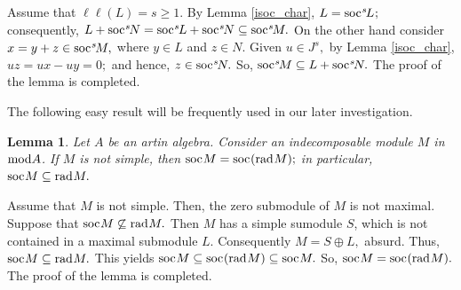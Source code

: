 \documentclass[10pt]{amsart}
\newtheorem{Lemma}[Theo]{Lemma}
\theoremstyle{definition}
\newcommand{\mmod}{{\rm mod}}
\newcommand{\rad}{{\rm rad}\hspace{.5pt}}
\newcommand{\soc}{{\rm soc}\hspace{.5pt}}
\newcommand{\hp}{\hspace{.5pt}}
\begin{document}
\vspace{-1.5pt}

 Assume that $\ell\ell(L)=s\ge 1$. By Lemma \ref{isoc_char}, $L=\soc^s \hspace{-1.2pt} L\hp ;$ consequently, $L+\soc^s\hspace{-1.2pt}N=\soc^s\hspace{-1pt}L+\soc^s\hspace{-1.2pt}N\subseteq \soc^s\hspace{-1.2pt}M.$ On the other hand consider $x=y+z\in \soc^s\hspace{-1.2pt}M,$ where $y\in L$ and $z\in N.$ Given $u\in J^s,$ by Lemma \ref{isoc_char}, $u z=ux - uy=0;$ and hence, $z\in \soc^s\hspace{-1.2pt}N.$ So, $\soc^s\hspace{-1.2pt}M\subseteq L+\soc^s\hspace{-1.2pt}N.$ The proof of the lemma is completed.

\smallskip

The following easy result will be frequently used in our later investigation. \vspace{-1pt}

\begin{Lemma}\label{soc_rad} Let $A$ be an artin algebra. Consider an indecomposable module $M$ in $\mmod A$. If $M$ is not simple, then $\soc M=\soc(\rad M);$ in particular, $\soc M\subseteq \rad M.$ 


\end{Lemma}

\vspace{-1.5pt}

 Assume that $M$ is not simple. Then, the zero submodule of $M$ is not maximal. Suppose that $\soc M\not\subseteq \rad M.$ Then $M$ has a simple sumodule $S$, which is not contained in a maximal submodule $L.$ Consequently $M=S\oplus L,$ absurd. Thus, $\soc M \subseteq \rad M.$ This yields $\soc M\subseteq \soc(\rad M) \subseteq \soc M.$ So, $\soc M=\soc(\rad M).$ The proof of the lemma is completed.
\end{document}
